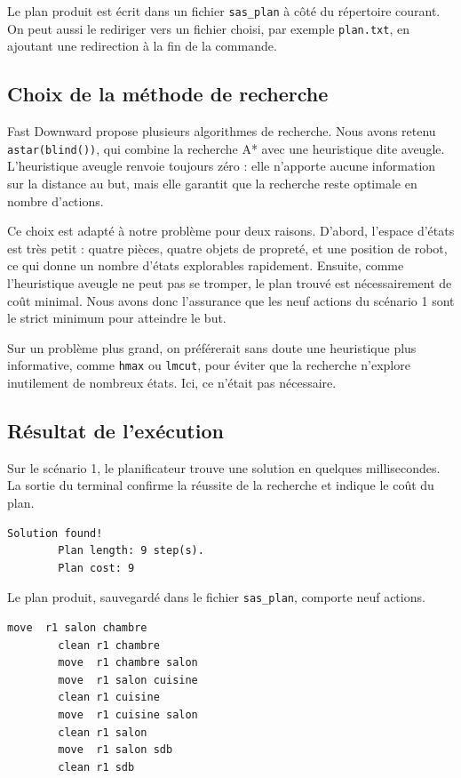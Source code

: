 \documentclass[a4paper, 11pt]{report}
\begin{document}
	Le plan produit est écrit dans un fichier \texttt{sas\_plan} à côté du
	répertoire courant. On peut aussi le rediriger vers un fichier choisi, par
	exemple \texttt{plan.txt}, en ajoutant une redirection à la fin de la
	commande.
	
	\subsection{Choix de la méthode de recherche}
	
	Fast Downward propose plusieurs algorithmes de recherche. Nous avons retenu
	\texttt{astar(blind())}, qui combine la recherche A* avec une heuristique
	dite aveugle. L'heuristique aveugle renvoie toujours zéro : elle
	n'apporte aucune information sur la distance au but, mais elle garantit que
	la recherche reste optimale en nombre d'actions.
	
	Ce choix est adapté à notre problème pour deux raisons. D'abord, l'espace
	d'états est très petit : quatre pièces, quatre objets de propreté, et une
	position de robot, ce qui donne un nombre d'états explorables rapidement.
	Ensuite, comme l'heuristique aveugle ne peut pas se tromper, le plan trouvé
	est nécessairement de coût minimal. Nous avons donc l'assurance que les
	neuf actions du scénario 1 sont le strict minimum pour atteindre le but.
	
	Sur un problème plus grand, on préférerait sans doute une heuristique plus
	informative, comme \texttt{hmax} ou \texttt{lmcut}, pour éviter que la
	recherche n'explore inutilement de nombreux états. Ici, ce n'était pas
	nécessaire.
	
	\subsection{Résultat de l'exécution}
	
	Sur le scénario 1, le planificateur trouve une solution en quelques
	millisecondes. La sortie du terminal confirme la réussite de la recherche
	et indique le coût du plan.
	
	\begin{lstlisting}[style=base, caption={Extrait de la sortie de Fast Downward.}]
		Solution found!
		Plan length: 9 step(s).
		Plan cost: 9
	\end{lstlisting}
	
	Le plan produit, sauvegardé dans le fichier \texttt{sas\_plan}, comporte
	neuf actions.
	
	\begin{lstlisting}[style=pddl, caption={Plan produit pour le scénario 1.}]
		move  r1 salon chambre
		clean r1 chambre
		move  r1 chambre salon
		move  r1 salon cuisine
		clean r1 cuisine
		move  r1 cuisine salon
		clean r1 salon
		move  r1 salon sdb
		clean r1 sdb
	\end{lstlisting}
	
\end{document}

